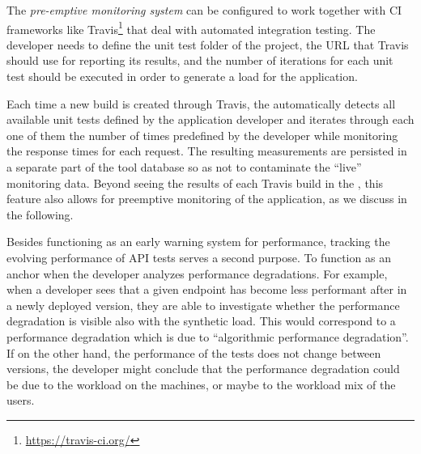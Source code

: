 \documentclass[conference]{IEEEtran}
\begin{document}
  

  The {\em pre-emptive monitoring system} can be configured to work together with CI frameworks like Travis\footnote{\url{https://travis-ci.org/}} that deal with automated integration testing. The developer needs to define the unit test folder of the project, the URL that Travis should use for reporting its results, and the number of iterations for each unit test should be executed in order to generate a load for the application. 
  
  Each time a new build is created through Travis, the \tool automatically detects all available unit tests defined by the application developer and iterates through each one of them the number of times predefined by the developer while monitoring the response times for each request. The resulting measurements are persisted in a separate part of the tool database so as not to contaminate the ``live'' monitoring data. Beyond seeing the results of each Travis build in the \tool, this feature also allows for preemptive monitoring of the application, as we discuss in the following.    

  Besides functioning as an early warning system for performance, tracking the evolving performance of API tests serves a second purpose. To function as an anchor when the developer analyzes performance degradations. For example, when a developer sees that a given endpoint has become less performant after in a newly deployed version, they are able to investigate whether the performance degradation is visible also with the synthetic load. This would correspond to a performance degradation which is due to ``algorithmic performance degradation''. If on the other hand, the performance of the tests does not change between versions, the developer might conclude that the performance degradation could be due to the workload on the machines, or maybe to the workload mix of the users.
  
  
\end{document}
